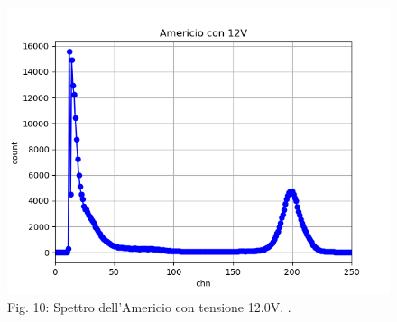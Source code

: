 \documentclass[a4paper]{article}
\begin{document}
\begin{figure}[H]

\includegraphics[width=01\textwidth]{Americio_con_12V}
        \caption{Fig. 10: Spettro dell'Americio con tensione 12.0V. .}
        \label{fig:10}
\end{figure}  
\newpage
	
\end{document}
